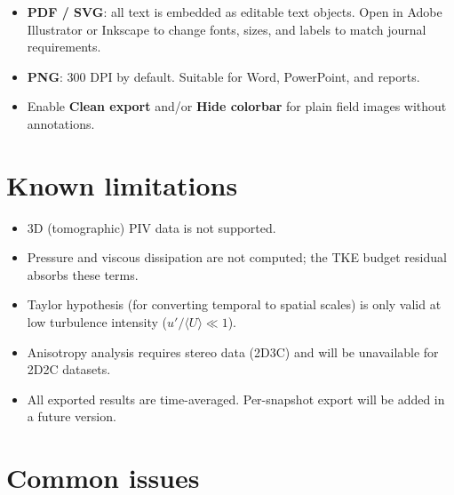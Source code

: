 \documentclass[11pt, a4paper]{report}
\newcommand{\uipth}[1]{\textbf{\textcolor{upblue}{#1}}}
\begin{document}
\begin{itemize}[leftmargin=1.5em]
  \item \textbf{PDF / SVG}: all text is embedded as editable text objects. Open in Adobe Illustrator or Inkscape to change fonts, sizes, and labels to match journal requirements.
  \item \textbf{PNG}: 300 DPI by default. Suitable for Word, PowerPoint, and reports.
  \item Enable \uipth{Clean export} and/or \uipth{Hide colorbar} for plain field images without annotations.
\end{itemize}

\section{Known limitations}

\begin{itemize}[leftmargin=1.5em]
  \item 3D (tomographic) PIV data is not supported.
  \item Pressure and viscous dissipation are not computed; the TKE budget residual absorbs these terms.
  \item Taylor hypothesis (for converting temporal to spatial scales) is only valid at low turbulence intensity ($u'/\langle U\rangle \ll 1$).
  \item Anisotropy analysis requires stereo data (2D3C) and will be unavailable for 2D2C datasets.
  \item All exported results are time-averaged. Per-snapshot export will be added in a future version.
\end{itemize}

\section{Common issues}
\end{document}
